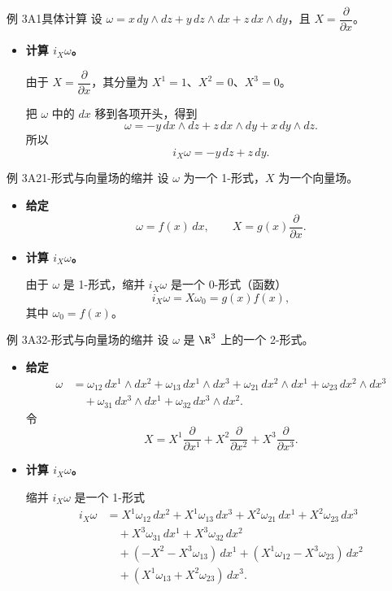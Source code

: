 \begin{statement}{例 3A1}{具体计算}
设 $\omega=x\,dy\wedge dz+y\,dz\wedge dx+z\,dx\wedge dy$，且 $X=\dfrac{\partial}{\partial x}$。
\begin{itemize}
\item \textbf{计算 $i_X\omega$。}

由于 $X=\dfrac{\partial}{\partial x}$，其分量为 $X^1=1$、$X^2=0$、$X^3=0$。

把 $\omega$ 中的 $dx$ 移到各项开头，得到
\[
  \omega=-y\,dx\wedge dz+z\,dx\wedge dy+x\,dy\wedge dz.
\]
所以
\[
  i_X\omega=-y\,dz+z\,dy.
\]
\end{itemize}
\end{statement}

\begin{statement}{例 3A2}{1-形式与向量场的缩并}
设 $\omega$ 为一个 1-形式，$X$ 为一个向量场。
\begin{itemize}
\item \textbf{给定}
\[
  \omega=f(x)\,dx,\qquad X=g(x)\frac{\partial}{\partial x}.
\]
\item \textbf{计算 $i_X\omega$。}

由于 $\omega$ 是 1-形式，缩并 $i_X\omega$ 是一个 0-形式（函数）
\[
  i_X\omega=X\omega_0=g(x)f(x),
\]
其中 $\omega_0=f(x)$。
\end{itemize}
\end{statement}

\begin{statement}{例 3A3}{2-形式与向量场的缩并}
设 $\omega$ 是 $\R^3$ 上的一个 2-形式。
\begin{itemize}
\item \textbf{给定}
\begin{align*}
  \omega&=\omega_{12}\,dx^1\wedge dx^2+\omega_{13}\,dx^1\wedge dx^3
     +\omega_{21}\,dx^2\wedge dx^1+\omega_{23}\,dx^2\wedge dx^3\\
   &\quad+\omega_{31}\,dx^3\wedge dx^1+\omega_{32}\,dx^3\wedge dx^2.
\end{align*}
令
\[
  X=X^1\frac{\partial}{\partial x^1}+X^2\frac{\partial}{\partial x^2}
    +X^3\frac{\partial}{\partial x^3}.
\]
\item \textbf{计算 $i_X\omega$。}

缩并 $i_X\omega$ 是一个 1-形式%
%
\begin{align*}
  i_X\omega
   &=X^1\omega_{12}\,dx^2+X^1\omega_{13}\,dx^3
      +X^2\omega_{21}\,dx^1+X^2\omega_{23}\,dx^3\\
   &\quad+X^3\omega_{31}\,dx^1+X^3\omega_{32}\,dx^2\\
   &\quad+(-X^2-X^3\omega_{13})\,dx^1
     +(X^1\omega_{12}-X^3\omega_{23})\,dx^2\\
   &\quad+(X^1\omega_{13}+X^2\omega_{23})\,dx^3.
\end{align*}
\end{itemize}
\end{statement}

